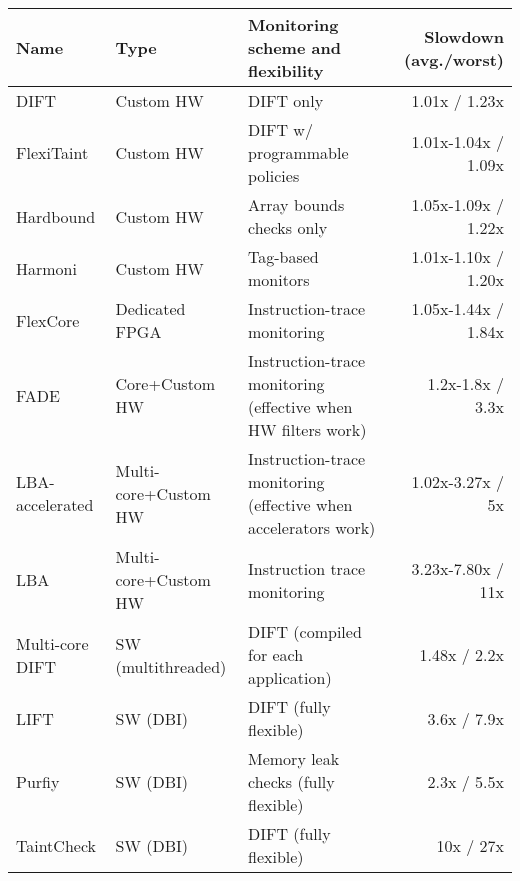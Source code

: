 \begin{tabular}{|l|l|l|r|}

\hline
{\bf Name} & {\bf Type} & {\bf Monitoring scheme and flexibility} & {\bf Slowdown (avg./worst)} \\ \hline\hline


DIFT \cite{dift-asplos04} & Custom HW & DIFT only & 1.01x / 1.23x \\ \hline
FlexiTaint \cite{flexitaint-hpca08} & Custom HW & DIFT w/ programmable policies & 1.01x-1.04x / 1.09x \\ \hline
Hardbound \cite{hardbound-asplos08} & Custom HW & Array bounds checks only & 1.05x-1.09x / 1.22x \\ \hline
Harmoni \cite{harmoni-dsn12} & Custom HW & Tag-based monitors & 1.01x-1.10x / 1.20x \\ \hline\hline

FlexCore \cite{flexcore-micro10} & Dedicated FPGA & Instruction-trace monitoring & 1.05x-1.44x / 1.84x \\ \hline
FADE \cite{fade-hpca14} & Core+Custom HW & Instruction-trace monitoring (effective when HW filters work) & 1.2x-1.8x / 3.3x \\ \hline
LBA-accelerated \cite{lba-isca08} & Multi-core+Custom HW & Instruction-trace monitoring (effective when accelerators work) & 1.02x-3.27x / 5x \\ \hline
LBA \cite{lba-asid06} & Multi-core+Custom HW & Instruction trace monitoring & 3.23x-7.80x / 11x \\ \hline \hline

Multi-core DIFT \cite{nagarajan-interact08} & SW (multithreaded) & DIFT (compiled for each application) & 1.48x / 2.2x \\ \hline

LIFT \cite{lift-micro06} & SW (DBI) & DIFT (fully flexible) & 3.6x / 7.9x \\ \hline
Purfiy \cite{purify-usenix92} & SW (DBI) & Memory leak checks (fully flexible) & 2.3x / 5.5x \\ \hline
TaintCheck \cite{taintcheck-ndsss05} & SW (DBI) & DIFT (fully flexible) & 10x / 27x \\ \hline


\end{tabular}
